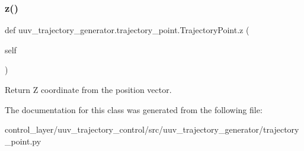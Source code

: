 \subsubsection{\texorpdfstring{z()}{z()}}
{\footnotesize\ttfamily def uuv\+\_\+trajectory\+\_\+generator.\+trajectory\+\_\+point.\+Trajectory\+Point.\+z (\begin{DoxyParamCaption}\item[{}]{self }\end{DoxyParamCaption})}

\begin{DoxyVerb}Return Z coordinate from the position vector.\end{DoxyVerb}
 

The documentation for this class was generated from the following file\+:\begin{DoxyCompactItemize}
\item 
control\+\_\+layer/uuv\+\_\+trajectory\+\_\+control/src/uuv\+\_\+trajectory\+\_\+generator/trajectory\+\_\+point.\+py\end{DoxyCompactItemize}
